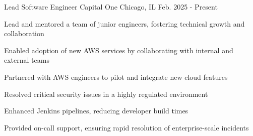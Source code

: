 

\begin{cventryroles}

\begin{cventries}
  \cventry
    {Lead Software Engineer}
    {Capital One}
    {Chicago, IL}
    {Feb. 2025 - Present}
    {
      \begin{cvitems}
        \item {Lead and mentored a team of junior engineers, fostering technical growth and collaboration}
        \item {Enabled adoption of new AWS services by collaborating with internal and external teams}
        \item {Partnered with AWS engineers to pilot and integrate new cloud features}
        \item {Resolved critical security issues in a highly regulated environment}
        \item {Enhanced Jenkins pipelines, reducing developer build times}
        \item {Provided on-call support, ensuring rapid resolution of enterprise-scale incidents}
      \end{cvitems}
    }
\end{cventries}
  

\end{cventryroles}
